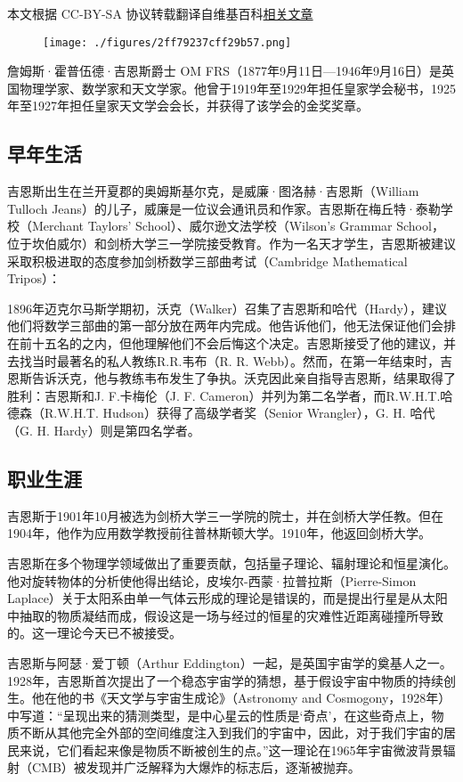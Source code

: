 
本文根据 CC-BY-SA 协议转载翻译自维基百科\href{https://en.wikipedia.org/wiki/James_Jeans}{相关文章}

\begin{figure}[ht]
\centering
\texttt{[image: ./figures/2ff79237cff29b57.png]}
\caption{} \label{fig_James_1}
\end{figure}
詹姆斯·霍普伍德·吉恩斯爵士 OM FRS（1877年9月11日—1946年9月16日）是英国物理学家、数学家和天文学家。他曾于1919年至1929年担任皇家学会秘书，1925年至1927年担任皇家天文学会会长，并获得了该学会的金奖奖章。
\subsection{早年生活}  
吉恩斯出生在兰开夏郡的奥姆斯基尔克，是威廉·图洛赫·吉恩斯（William Tulloch Jeans）的儿子，威廉是一位议会通讯员和作家。吉恩斯在梅丘特·泰勒学校（Merchant Taylors' School）、威尔逊文法学校（Wilson's Grammar School，位于坎伯威尔）和剑桥大学三一学院接受教育。作为一名天才学生，吉恩斯被建议采取积极进取的态度参加剑桥数学三部曲考试（Cambridge Mathematical Tripos）：

1896年迈克尔马斯学期初，沃克（Walker）召集了吉恩斯和哈代（Hardy），建议他们将数学三部曲的第一部分放在两年内完成。他告诉他们，他无法保证他们会排在前十五名的之内，但他理解他们不会后悔这个决定。吉恩斯接受了他的建议，并去找当时最著名的私人教练R.R.韦布（R. R. Webb）。然而，在第一年结束时，吉恩斯告诉沃克，他与教练韦布发生了争执。沃克因此亲自指导吉恩斯，结果取得了胜利：吉恩斯和J. F.卡梅伦（J. F. Cameron）并列为第二名学者，而R.W.H.T.哈德森（R.W.H.T. Hudson）获得了高级学者奖（Senior Wrangler），G. H. 哈代（G. H. Hardy）则是第四名学者。
\subsection{职业生涯}  
吉恩斯于1901年10月被选为剑桥大学三一学院的院士，并在剑桥大学任教。但在1904年，他作为应用数学教授前往普林斯顿大学。1910年，他返回剑桥大学。

吉恩斯在多个物理学领域做出了重要贡献，包括量子理论、辐射理论和恒星演化。他对旋转物体的分析使他得出结论，皮埃尔-西蒙·拉普拉斯（Pierre-Simon Laplace）关于太阳系由单一气体云形成的理论是错误的，而是提出行星是从太阳中抽取的物质凝结而成，假设这是一场与经过的恒星的灾难性近距离碰撞所导致的。这一理论今天已不被接受。

吉恩斯与阿瑟·爱丁顿（Arthur Eddington）一起，是英国宇宙学的奠基人之一。1928年，吉恩斯首次提出了一个稳态宇宙学的猜想，基于假设宇宙中物质的持续创生。他在他的书《天文学与宇宙生成论》（Astronomy and Cosmogony，1928年）中写道：“呈现出来的猜测类型，是中心星云的性质是‘奇点’，在这些奇点上，物质不断从其他完全外部的空间维度注入到我们的宇宙中，因此，对于我们宇宙的居民来说，它们看起来像是物质不断被创生的点。”这一理论在1965年宇宙微波背景辐射（CMB）被发现并广泛解释为大爆炸的标志后，逐渐被抛弃。

